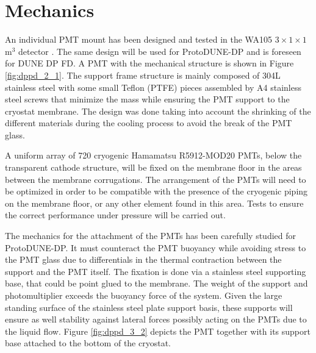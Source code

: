 \section{Mechanics}
\label{sec:fddp-pd-3}


An individual PMT mount has been designed and tested in the WA105 $3\times1\times1$\,m$^3$ detector \cite{Zambelli:2017dkg}. The same design will be used for ProtoDUNE-DP and is foreseen for DUNE DP FD. A PMT with the mechanical structure is shown in Figure \ref{fig:dppd_2_1}. The support frame structure is mainly composed of \num{304}L stainless steel with some small Teflon (PTFE) pieces assembled by A4 stainless steel screws that minimize the mass while ensuring the PMT support to the cryostat membrane. The design was done taking into account the shrinking of the different materials during the cooling process to avoid the break of the PMT glass.


A uniform array of \num{720} cryogenic Hamamatsu R5912-MOD20 PMTs, below the transparent cathode structure, will be fixed on the membrane floor in the areas between the membrane corrugations. The arrangement of the PMTs will need to be optimized in order to be compatible with the presence of the cryogenic piping on the membrane floor, or any other element found in this area. Tests to ensure the correct performance under pressure will be carried out.

The mechanics for the attachment of the PMTs has been carefully studied for ProtoDUNE-DP. It must counteract the PMT buoyancy while avoiding stress to the PMT glass due to differentials in the thermal contraction between the support and the PMT itself. The fixation is done via a stainless steel supporting base, that could be point glued to the membrane. The weight of the support and photomultiplier exceeds the buoyancy force of the system. Given the large standing surface of the stainless steel plate support basis, these supports will ensure as well stability against lateral forces possibly acting on the PMTs due to the liquid flow. Figure \ref{fig:dppd_3_2} depicts the PMT together with its support base attached to the bottom of the cryostat.

